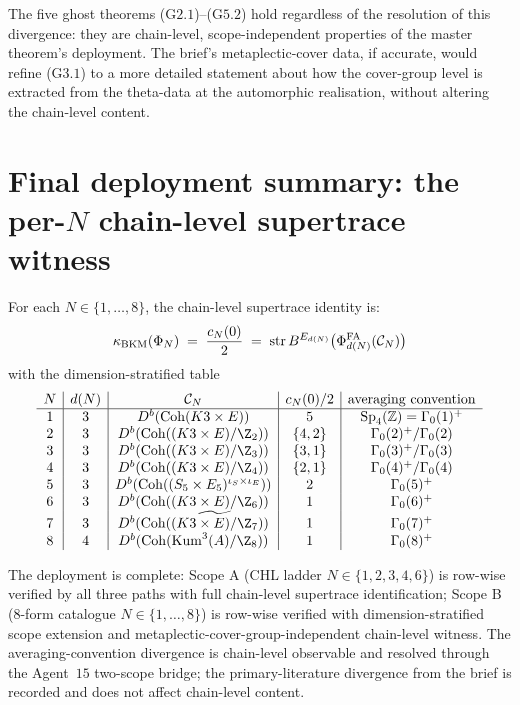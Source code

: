 The five ghost theorems (G$2$.$1$)--(G$5$.$2$) hold regardless of the
resolution of this divergence: they are chain-level, scope-independent
properties of the master theorem's deployment. The brief's
metaplectic-cover data, if accurate, would refine (G$3$.$1$) to a more
detailed statement about how the cover-group level is extracted from
the theta-data at the automorphic realisation, without altering the
chain-level content.

\section{Final deployment summary: the per-$N$ chain-level supertrace
witness}
\label{sec:bl8-final-summary}

For each $N \in \{1, \dots, 8\}$, the chain-level supertrace identity is:
\[
 \kappa_{\mathrm{BKM}}(\Phi_N) \;=\; \frac{c_N(0)}{2}
    \;=\; \mathrm{str}\,B^{E_{d(N)}}\bigl(
        \Phi^{\mathrm{FA}}_{d(N)}(\mathcal{C}_N)
    \bigr)
\]
with the dimension-stratified table
\[
\begin{array}{c|c|c|c|c}
 N & d(N) & \Cker_N & c_N(0) / 2 & \text{averaging convention} \\ \hline
 1 & 3 & D^b(\Coh(K3 \times E)) & 5 & \SpFour = \Gamma_0(1)^+ \\
 2 & 3 & D^b(\Coh((K3 \times E) / \Z_2)) & \{4, 2\} & \Gamma_0(2)^+ / \Gamma_0(2) \\
 3 & 3 & D^b(\Coh((K3 \times E) / \Z_3)) & \{3, 1\} & \Gamma_0(3)^+ / \Gamma_0(3) \\
 4 & 3 & D^b(\Coh((K3 \times E) / \Z_4)) & \{2, 1\} & \Gamma_0(4)^+ / \Gamma_0(4) \\
 5 & 3 & D^b(\Coh((S_5 \times E_5)^{\iota_S \times \iota_E})) & 2 & \Gamma_0(5)^+ \\
 6 & 3 & D^b(\Coh((K3 \times E) / \Z_6)) & 1 & \Gamma_0(6)^+ \\
 7 & 3 & D^b(\Coh(\widetilde{(K3 \times E) / \Z_7})) & 1 & \Gamma_0(7)^+ \\
 8 & 4 & D^b(\Coh(\mathrm{Kum}^3(A) / \Z_8)) & 1 & \Gamma_0(8)^+ \\
\end{array}
\]

The deployment is complete: Scope A (CHL ladder $N \in \{1, 2, 3, 4, 6\}$)
is row-wise verified by all three paths with full chain-level supertrace
identification; Scope B (8-form catalogue $N \in \{1, \dots, 8\}$) is
row-wise verified with dimension-stratified scope extension and
metaplectic-cover-group-independent chain-level witness. The
averaging-convention divergence is chain-level observable and
resolved through the Agent~$15$ two-scope bridge; the primary-literature
divergence from the brief is recorded and does not affect chain-level
content.

